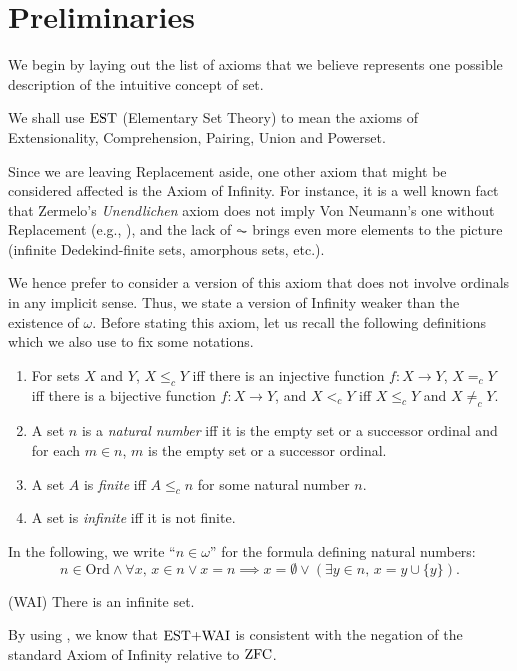 \section{Preliminaries}
We begin by laying out the list of axioms that we believe represents one possible
description of the intuitive concept of set.
\begin{definition}
	We shall use $\mathrm{EST}$ (Elementary Set Theory) to mean the axioms of Extensionality, Comprehension, Pairing, Union and Powerset.
\end{definition}
Since we are leaving
Replacement aside, one other axiom that might be considered affected is the
Axiom of Infinity. For instance, it is a well known fact that Zermelo's
\textit{Unendlichen} axiom does not imply Von Neumann's one without Replacement
(e.g., \cite[Exercise II.4.21]{Kunen}), and the lack of $\AC$ brings even more
elements to the picture (infinite Dedekind-finite sets, amorphous sets, etc.).

We hence prefer to consider a version of this axiom that does not involve
ordinals in any implicit sense. Thus, we state a version of Infinity weaker than the
existence of $\omega$. Before stating this axiom, let us recall the following
definitions which we also use to fix some notations.
\begin{definition}
	\begin{enumerate}
		  \item For sets  $X$ and $Y$, $X\leq_c Y$ iff there is an injective function $f:X\to Y$, $X =_c Y$ iff there is a bijective function $f:X\to Y$, and $X <_c Y$ iff $X\leq_c Y$ and $X\neq_c Y$.
		\item A set $n$ is a \emph{natural number} iff it is the empty set or a successor ordinal and for each $m\in n$, $m$ is the empty set or a successor ordinal.
		\item A set $A$ is \emph{finite} iff $A\leq_c n$ for some natural number $n$.
		\item A set is \emph{infinite} iff it is not finite.
	\end{enumerate}
\end{definition}
In the following, we write “$n\in\omega$” for the formula defining natural numbers:
\[
n \in \text{Ord} \land \forall x, \, x \in n \lor  x = n \implies x = \emptyset \lor (\exists y \in
n, \, x = y \cup \{y\}).
\]

\begin{WeakInf}
  \textup{(WAI)} There is an infinite set.
\end{WeakInf}
By using \cite[Exercise II.4.21]{Kunen}, we know that $\text{EST+WAI}$ is consistent with
the negation of the standard Axiom of Infinity relative to $\mathrm{ZFC}$.

